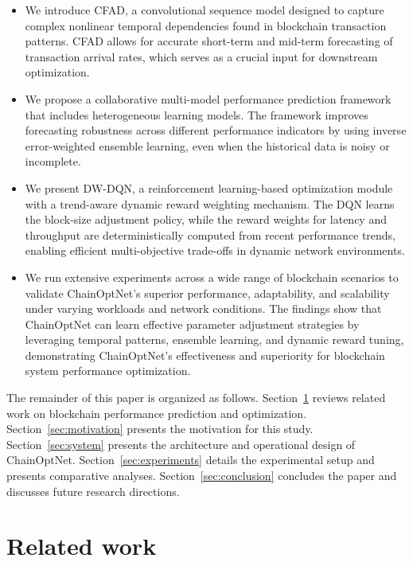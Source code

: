 \documentclass[a4paper,fleqn]{cas-dc}
\begin{document}
\begin{itemize}
	\item We introduce CFAD, a convolutional sequence model designed to capture complex nonlinear temporal dependencies found in blockchain transaction patterns. CFAD allows for accurate short-term and mid-term forecasting of transaction arrival rates, which serves as a crucial input for downstream optimization.
	
	\item We propose a collaborative multi-model performance prediction framework that includes heterogeneous learning models. The framework improves forecasting robustness across different performance indicators by using inverse error-weighted ensemble learning, even when the historical data is noisy or incomplete.
	
	\item We present DW-DQN, a reinforcement learning-based optimization module with a trend-aware dynamic reward weighting mechanism. The DQN learns the block-size adjustment policy, while the reward weights for latency and throughput are deterministically computed from recent performance trends, enabling efficient multi-objective trade-offs in dynamic network environments.
	
	\item We run extensive experiments across a wide range of blockchain scenarios to validate ChainOptNet's superior performance, adaptability, and scalability under varying workloads and network conditions. The findings show that ChainOptNet can learn effective parameter adjustment strategies by leveraging temporal patterns, ensemble learning, and dynamic reward tuning, demonstrating ChainOptNet's effectiveness and superiority for blockchain system performance optimization.
\end{itemize}



The remainder of this paper is organized as follows. Section~\ref{sec:related} reviews related work on blockchain performance prediction and optimization. Section~\ref{sec:motivation} presents the motivation for this study. Section~\ref{sec:system} presents the architecture and operational design of ChainOptNet. Section~\ref{sec:experiments} details the experimental setup and presents comparative analyses.   Section~\ref{sec:conclusion} concludes the paper and discusses future research directions.




\section{Related work}\label{sec:related}
\end{document}

